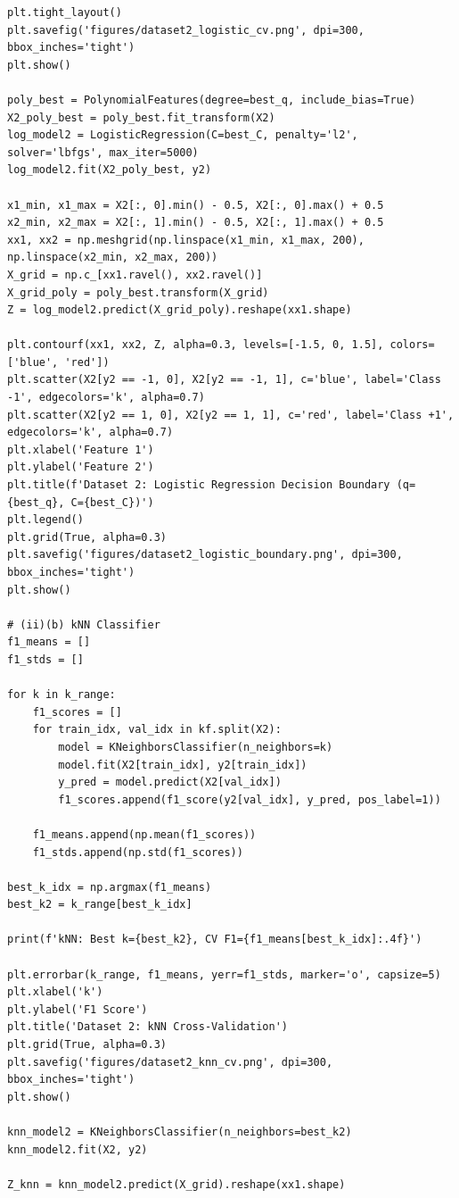 \documentclass[11pt,a4paper]{article}
\begin{document}
\begin{lstlisting}
plt.tight_layout()
plt.savefig('figures/dataset2_logistic_cv.png', dpi=300, bbox_inches='tight')
plt.show()

poly_best = PolynomialFeatures(degree=best_q, include_bias=True)
X2_poly_best = poly_best.fit_transform(X2)
log_model2 = LogisticRegression(C=best_C, penalty='l2', solver='lbfgs', max_iter=5000)
log_model2.fit(X2_poly_best, y2)

x1_min, x1_max = X2[:, 0].min() - 0.5, X2[:, 0].max() + 0.5
x2_min, x2_max = X2[:, 1].min() - 0.5, X2[:, 1].max() + 0.5
xx1, xx2 = np.meshgrid(np.linspace(x1_min, x1_max, 200), np.linspace(x2_min, x2_max, 200))
X_grid = np.c_[xx1.ravel(), xx2.ravel()]
X_grid_poly = poly_best.transform(X_grid)
Z = log_model2.predict(X_grid_poly).reshape(xx1.shape)

plt.contourf(xx1, xx2, Z, alpha=0.3, levels=[-1.5, 0, 1.5], colors=['blue', 'red'])
plt.scatter(X2[y2 == -1, 0], X2[y2 == -1, 1], c='blue', label='Class -1', edgecolors='k', alpha=0.7)
plt.scatter(X2[y2 == 1, 0], X2[y2 == 1, 1], c='red', label='Class +1', edgecolors='k', alpha=0.7)
plt.xlabel('Feature 1')
plt.ylabel('Feature 2')
plt.title(f'Dataset 2: Logistic Regression Decision Boundary (q={best_q}, C={best_C})')
plt.legend()
plt.grid(True, alpha=0.3)
plt.savefig('figures/dataset2_logistic_boundary.png', dpi=300, bbox_inches='tight')
plt.show()

# (ii)(b) kNN Classifier
f1_means = []
f1_stds = []

for k in k_range:
    f1_scores = []
    for train_idx, val_idx in kf.split(X2):
        model = KNeighborsClassifier(n_neighbors=k)
        model.fit(X2[train_idx], y2[train_idx])
        y_pred = model.predict(X2[val_idx])
        f1_scores.append(f1_score(y2[val_idx], y_pred, pos_label=1))
    
    f1_means.append(np.mean(f1_scores))
    f1_stds.append(np.std(f1_scores))

best_k_idx = np.argmax(f1_means)
best_k2 = k_range[best_k_idx]

print(f'kNN: Best k={best_k2}, CV F1={f1_means[best_k_idx]:.4f}')

plt.errorbar(k_range, f1_means, yerr=f1_stds, marker='o', capsize=5)
plt.xlabel('k')
plt.ylabel('F1 Score')
plt.title('Dataset 2: kNN Cross-Validation')
plt.grid(True, alpha=0.3)
plt.savefig('figures/dataset2_knn_cv.png', dpi=300, bbox_inches='tight')
plt.show()

knn_model2 = KNeighborsClassifier(n_neighbors=best_k2)
knn_model2.fit(X2, y2)

Z_knn = knn_model2.predict(X_grid).reshape(xx1.shape)


\end{lstlisting}
\end{document}
